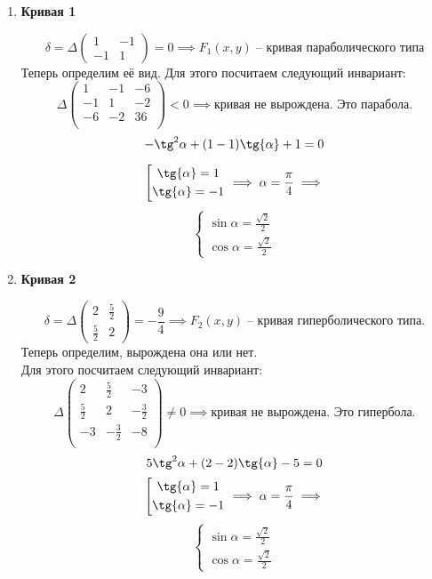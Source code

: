 \documentclass{article}
\theoremstyle{plain}
\begin{document}
\begin{enumerate}
    \item \textbf{Кривая 1}

$$\delta = \Delta \begin{pmatrix} 
1 & -1 \\
-1 & 1
\end{pmatrix} = 0 \implies F_1(x, y)\; \text{--
кривая параболического типа}$$
Теперь определим её вид. Для этого посчитаем следующий инвариант:
$$ \Delta\begin{pmatrix}
    1 & -1 & -6 \\
    -1 & 1 & -2 \\
    -6 & -2 & 36\\
\end{pmatrix}  < 0 \implies \text{кривая не вырождена. Это парабола.}$$
$$-\tg^2{\alpha} + (1 - 1)\tg{\alpha} + 1 = 0
$$

$$
\left[ \begin{gathered}
    \tg{\alpha} = 1 \\
    \tg{\alpha} = -1
\end{gathered} \right.\implies \alpha = \frac{\pi}{4}\implies$$
\begin{equation}
    \begin{cases}
    \sin{\alpha} = \frac{\sqrt{2}}{2} \\
    \cos{\alpha} = \frac{\sqrt{2}}{2}
    \end{cases}
\end{equation}
\item \textbf{Кривая 2}

$$\delta = \Delta \begin{pmatrix} 
2 & \frac{5}{2} \\
\frac{5}{2} & 2
\end{pmatrix} = -\frac{9}{4} \implies F_2(x, y)\; \text{--
кривая гиперболического типа.}$$
Теперь определим, вырождена она или нет.\\
Для этого посчитаем следующий инвариант:
$$\Delta\begin{pmatrix}
    2 & \frac{5}{2} & -3 \\
    \frac{5}{2} & 2 & -\frac{3}{2} \\
    -3 & -\frac{3}{2} & -8\\
\end{pmatrix}  \ne 0 \implies \text{кривая не вырождена. Это гипербола.}$$
$$5\tg^2{\alpha} + (2 - 2)\tg{\alpha} - 5 = 0
$$
$$
\left[ \begin{gathered}
    \tg{\alpha} = 1 \\
    \tg{\alpha} = -1
\end{gathered} \right.\implies \alpha = \frac{\pi}{4}\implies$$
\begin{equation}
    \begin{cases}
    \sin{\alpha} = \frac{\sqrt{2}}{2} \\
    \cos{\alpha} = \frac{\sqrt{2}}{2}
    \end{cases}
\end{equation}
\end{enumerate}
\newpage
\end{document}
